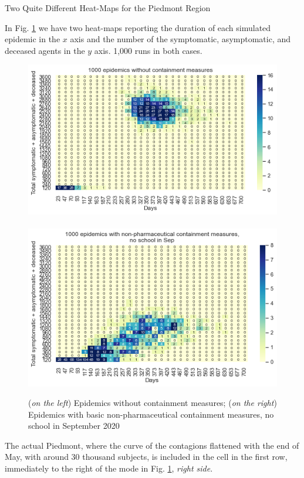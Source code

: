 \documentclass[8pt]{beamer}
\begin{document}
\begin{frame}{Two Quite Different Heat-Maps for the Piedmont Region}

In Fig. \ref{2HM} we have two heat-maps reporting the duration of each simulated epidemic in the $x$ axis and the number of the symptomatic, asymptomatic, and deceased agents in the $y$ axis. 1,000 runs in both cases.

\begin{figure}[H]
\center
\includegraphics[scale=0.3]{HM30_readRunResults1k_noControl_plusHM.png}~~~\includegraphics[scale=0.3]{HM30_readRunResults1k_withControl_plusHM.png} 

\caption{(\emph{on the left}) Epidemics without containment measures;
 (\emph{on the right}) Epidemics with basic non-pharmaceutical containment measures, no school in September 2020} 
\label{2HM}
\end{figure}

The actual Piedmont, where the curve of the contagions flattened with the end of May, with around 30 thousand subjects, is included in the cell in the first row, immediately to the right of the mode in Fig. \ref{2HM}, \emph{right side}.

\end{frame}
\end{document}
